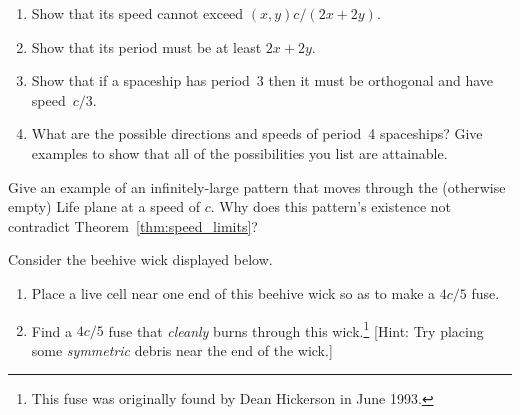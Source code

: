 \begin{multicols}{2}
\begin{problem}
		\begin{enumerate}[label=\bf\color{ocre}(\alph*)]
			\item Show that its speed cannot exceed $(x,y)c/(2x+2y)$.
			
			\item Show that its period must be at least $2x+2y$.
			
			\item Show that if a spaceship has period~3 then it must be orthogonal and have speed~$c/3$.
			
			\item What are the possible directions and speeds of period~4 spaceships? Give examples to show that all of the possibilities you list are attainable.
		\end{enumerate}
	\end{problem}
	
	
	\mfilbreak
	
	
	\begin{problem}\label{exer:infinite_spaceship} 
		Give an example of an infinitely-large pattern that moves through the (otherwise empty) Life plane at a speed of $c$. Why does this pattern's existence not contradict Theorem~\ref{thm:speed_limits}?
	\end{problem}
	
	
	\mfilbreak
	
	
	\begin{problem}\label{exer:4c5_fuse}
		Consider the beehive wick displayed below.
		\begin{center}
		\end{center}
		
		\begin{enumerate}[label=\bf\color{ocre}(\alph*)]
			\item {} Place a live cell near one end of this beehive wick so as to make a $4c/5$ fuse.
			
			\item {} Find a $4c/5$ fuse that \emph{cleanly} burns through this wick.\footnote{This fuse was originally found by Dean Hickerson in June 1993.} [Hint: Try placing some \emph{symmetric} debris near the end of the wick.]
		\end{enumerate}
	\end{problem}
	

\end{multicols}
